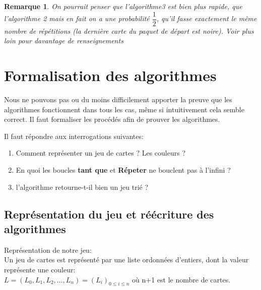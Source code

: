 \documentclass[10pt,french]{article}
\theoremstyle{plain}
\newtheorem*{remarque}{Remarque}
\begin{document}
\begin{remarque}
On pourrait penser que l'algorithme3 est bien plus rapide, que l'algorithme 2 mais en fait on a une probabilité $ \dfrac{1}{2} $, qu'il fasse exactement le même nombre de répétitions (la dernière carte du paquet de départ est noire). Voir plus loin pour davantage de renseignements
\end{remarque}


\section{Formalisation des algorithmes}

Nous ne pouvons pas ou du moins difficilement  apporter la preuve que les algorithmes fonctionnent dans tous les cas, même si intuitivement cela semble correct. Il faut formaliser les procédés afin de prouver les algorithmes.

Il faut répondre aux interrogations suivantes:
\begin{enumerate}
    \item Comment représenter un jeu de cartes ? Les couleurs ?
    \item En quoi  les boucles \textbf{tant que } et \textbf{Répeter} ne bouclent pas à l'infini ?
    \item l'algorithme retourne-t-il  bien un jeu trié ?
\end{enumerate}
\subsection{Représentation du jeu et réécriture des algorithmes}
Représentation de notre jeu:\\
Un jeu de cartes est représenté par une liste ordonnées d'entiers, dont la valeur représente une couleur:\\
 $L=(L_0,L_1,L_2, \dots,L_n)=(L_i)_{0\leqslant i \leqslant n}$ où n+1 est le nombre de cartes.
 
\end{document}
